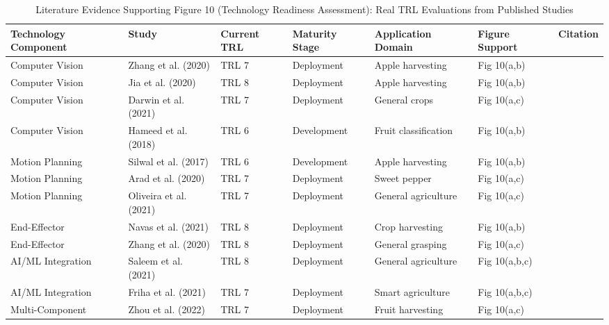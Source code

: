 \begin{table*}[htbp]
\centering
\small
\caption{Literature Evidence Supporting Figure 10 (Technology Readiness Assessment): Real TRL Evaluations from Published Studies}
\label{tab:figure10_support}
\begin{tabular}{p{}p{}p{}p{}p{}p{}p{}}
\toprule
\textbf{Technology Component} & \textbf{Study} & \textbf{Current TRL} & \textbf{Maturity Stage} & \textbf{Application Domain} & \textbf{Figure Support} & \textbf{Citation} \\ \midrule

Computer Vision & Zhang et al. (2020) & TRL 7 & Deployment & Apple harvesting & Fig 10(a,b) & \cite{zhang2020technology} \\

Computer Vision & Jia et al. (2020) & TRL 8 & Deployment & Apple harvesting & Fig 10(a,b) & \cite{jia2020apple} \\

Computer Vision & Darwin et al. (2021) & TRL 7 & Deployment & General crops & Fig 10(a,c) & \cite{darwin2021recognition} \\

Computer Vision & Hameed et al. (2018) & TRL 6 & Development & Fruit classification & Fig 10(a,b) & \cite{hameed2018comprehensive} \\

Motion Planning & Silwal et al. (2017) & TRL 6 & Development & Apple harvesting & Fig 10(a,b) & \cite{silwal2017design} \\

Motion Planning & Arad et al. (2020) & TRL 7 & Deployment & Sweet pepper & Fig 10(a,c) & \cite{arad2020development} \\

Motion Planning & Oliveira et al. (2021) & TRL 7 & Deployment & General agriculture & Fig 10(a,c) & \cite{oliveira2021advances} \\

End-Effector & Navas et al. (2021) & TRL 8 & Deployment & Crop harvesting & Fig 10(a,b) & \cite{navas2021soft} \\

End-Effector & Zhang et al. (2020) & TRL 8 & Deployment & General grasping & Fig 10(a,c) & \cite{zhang2020state} \\

AI/ML Integration & Saleem et al. (2021) & TRL 8 & Deployment & General agriculture & Fig 10(a,b,c) & \cite{saleem2021automation} \\

AI/ML Integration & Friha et al. (2021) & TRL 7 & Deployment & Smart agriculture & Fig 10(a,b,c) & \cite{friha2021internet} \\

Multi-Component & Zhou et al. (2022) & TRL 7 & Deployment & Fruit harvesting & Fig 10(a,c) & \cite{zhou2022intelligent} \\
\bottomrule
\end{tabular}
\end{table*}
